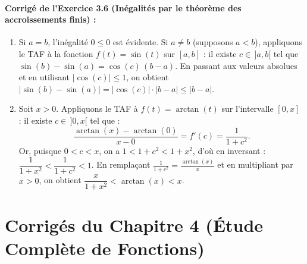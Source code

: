 \paragraph{Corrigé de l'Exercice 3.6 (Inégalités par le théorème des accroissements finis) :}
\begin{enumerate}[label=(\alph*)]
    \item Si $a = b$, l'inégalité $0 \le 0$ est évidente. Si $a \neq b$ (supposons $a < b$), appliquons le TAF à la fonction $f(t) = \sin(t)$ sur $[a, b]$ : il existe $c \in \,]a, b[$ tel que $\sin(b) - \sin(a) = \cos(c)\,(b - a)$. En passant aux valeurs absolues et en utilisant $|\cos(c)| \le 1$, on obtient $\bigl|\sin(b) - \sin(a)\bigr| = |\cos(c)|\cdot|b - a| \le |b - a|$.
    \item Soit $x > 0$. Appliquons le TAF à $f(t) = \arctan(t)$ sur l'intervalle $[0, x]$ : il existe $c \in \,]0, x[$ tel que :
    \[
        \frac{\arctan(x) - \arctan(0)}{x - 0} = f'(c) = \frac{1}{1 + c^2}.
    \]
    Or, puisque $0 < c < x$, on a $1 < 1 + c^2 < 1 + x^2$, d'où en inversant : $\dfrac{1}{1 + x^2} < \dfrac{1}{1 + c^2} < 1$. En remplaçant $\frac{1}{1+c^2} = \frac{\arctan(x)}{x}$ et en multipliant par $x > 0$, on obtient $\boxed{\dfrac{x}{1 + x^2} < \arctan(x) < x}$.
\end{enumerate}

\section{Corrigés du Chapitre 4 (Étude Complète de Fonctions)}


